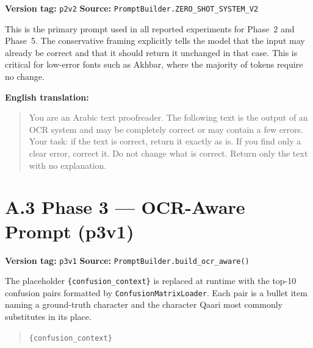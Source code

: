 \textbf{Version tag:} \texttt{p2v2} \quad
\textbf{Source:} \texttt{PromptBuilder.ZERO\_SHOT\_SYSTEM\_V2}

\noindent
This is the primary prompt used in all reported experiments for Phase~2 and
Phase~5. The conservative framing explicitly tells the model that the input
may already be correct and that it should return it unchanged in that case.
This is critical for low-error fonts such as Akhbar, where the majority of
tokens require no change.

\begin{quote}\itshape
\end{quote}

\textbf{English translation:}
\begin{quote}
  You are an Arabic text proofreader.
  The following text is the output of an OCR system and may be completely
  correct or may contain a few errors.
  Your task: if the text is correct, return it exactly as is.
  If you find only a clear error, correct it. Do not change what is correct.
  Return only the text with no explanation.
\end{quote}

\section*{A.3 \quad Phase 3 --- OCR-Aware Prompt (p3v1)}

\textbf{Version tag:} \texttt{p3v1} \quad
\textbf{Source:} \texttt{PromptBuilder.build\_ocr\_aware()}

\noindent
The placeholder \texttt{\{confusion\_context\}} is replaced at runtime with
the top-10 confusion pairs formatted by \texttt{ConfusionMatrixLoader}.
Each pair is a bullet item naming a ground-truth character and the character
Qaari most commonly substitutes in its place.

\begin{quote}\itshape

  \texttt{\{confusion\_context\}}

\end{quote}

